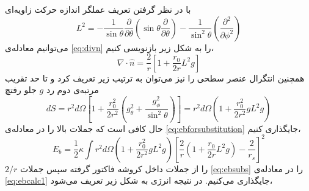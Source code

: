 با در نظر گرفتن تعریف عملگر اندازه حرکت زاویه‌ای 
\begin{equation}
L^2=-\frac{1}{\sin\theta}\frac{\partial}{\partial\theta}\left(\sin\theta\frac{\partial}{\partial\theta}\right)-\frac{1}{\sin^2\theta}\left(\frac{\partial^2}{\partial\phi^2}\right)
\end{equation}
می‌توانیم معادله‌ی
\ref{eq:divn}
را به شکل زیر بازنویسی کنیم،
\begin{equation}
\nabla\cdot\hat n =\frac{2}{r}\left[1+\frac{r_0}{2r}L^2g\right]
\label{eq:divnL2}
\end{equation}
همچنین انتگرال عنصر سطحی را نیز می‌توان به ترتیب زیر تعریف کرد و تا حد تقریب مرتبه‌ی دوم رد $g$ جلو رفتچ
\begin{equation}
dS=r^2d\Omega\left[1+\frac{r_0^2}{2r^2}\left(g_\theta^2+\frac{g_\phi^2}{\sin^2\theta}\right)\right]=r^2d\Omega\left(1+\frac{r_0^2}{2r^2}gL^2g\right)
\label{eq:dsL2}
\end{equation}
حال کافی است که جملات بالا را در معادله‌ی \ref{eq:ebforsubstitution} جایگذاری کنیم،
\begin{equation}
E_b=\frac{1}{2}\kappa\int r^2d\Omega\left(1+\frac{r_0^2}{2r^2}gL^2g\right)\left[\frac{2}{r}\left(1+\frac{r_0}{2r}L^2g\right)-\frac{2}{r_s}\right]^2
\label{eq:ebcalc1}
\end{equation}
 $2/r$ را از جملات داخل کروشه فاکتور گرفته سپس جملات 
 \ref{eq:ebsubs}
 را در معادله‌ی
 \ref{eq:ebcalc1}
 جایگذاری می‌کنیم‌. در نتیجه انرژی به شکل زیر تعریف می‌شود،



